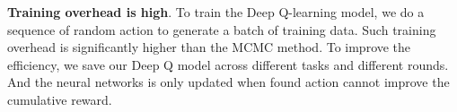 \textbf{Training overhead is high}. To train the Deep Q-learning model, we do a sequence of random action to generate a batch of training data. Such training overhead is significantly higher than the MCMC method. To improve the efficiency, we save our Deep Q model across different tasks and different rounds. And the neural networks is only updated when found action cannot improve the cumulative reward. 